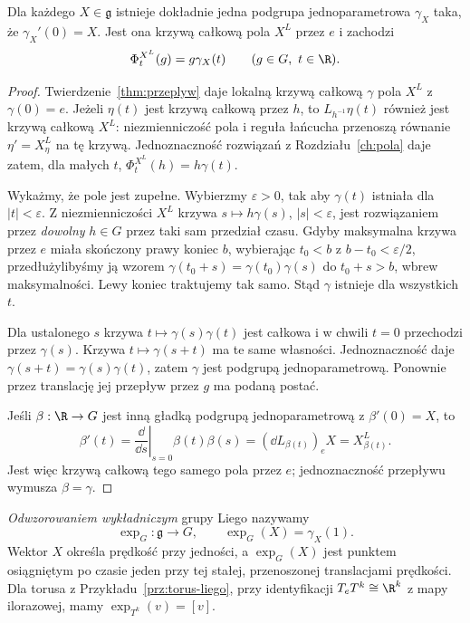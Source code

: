 \begin{twierdzenie}
\label{thm:one-param-lie}
Dla każdego $X\in\mathfrak g$ istnieje dokładnie jedna
podgrupa jednoparametrowa $\gamma_X$ taka, że
$\gamma_X'(0)=X$. Jest ona krzywą całkową pola $X^L$
przez $e$ i zachodzi
\[
 \Phi_t^{X^L}(g)=g\gamma_X(t)
 \qquad (g\in G,\ t\in\R).
\]
\end{twierdzenie}
\begin{proof}
Twierdzenie~\ref{thm:przeplyw} daje lokalną krzywą
całkową $\gamma$ pola $X^L$ z $\gamma(0)=e$.
Jeżeli $\eta(t)$ jest krzywą całkową przez $h$, to
$L_{h^{-1}}\eta(t)$ również jest krzywą całkową $X^L$:
niezmienniczość pola i reguła łańcucha przenoszą równanie
$\eta'=X^L_\eta$ na tę krzywą. Jednoznaczność rozwiązań
z Rozdziału~\ref{ch:pola} daje zatem, dla małych $t$,
$\Phi_t^{X^L}(h)=h\gamma(t)$.

Wykażmy, że pole jest zupełne. Wybierzmy $\varepsilon>0$,
tak aby $\gamma(t)$ istniała dla $|t|<\varepsilon$.
Z niezmienniczości $X^L$ krzywa
$s\mapsto h\gamma(s)$, $|s|<\varepsilon$, jest
rozwiązaniem przez \emph{dowolny} $h\in G$ przez taki sam
przedział czasu. Gdyby maksymalna krzywa przez $e$ miała
skończony prawy koniec $b$, wybierając $t_0<b$ z
$b-t_0<\varepsilon/2$, przedłużylibyśmy ją wzorem
$\gamma(t_0+s)=\gamma(t_0)\gamma(s)$ do
$t_0+s>b$, wbrew maksymalności. Lewy koniec traktujemy
tak samo. Stąd $\gamma$ istnieje dla wszystkich $t$.

Dla ustalonego $s$ krzywa $t\mapsto\gamma(s)\gamma(t)$
jest całkowa i w chwili $t=0$ przechodzi przez
$\gamma(s)$. Krzywa $t\mapsto\gamma(s+t)$ ma te same
własności. Jednoznaczność daje
$\gamma(s+t)=\gamma(s)\gamma(t)$, zatem $\gamma$ jest
podgrupą jednoparametrową. Ponownie przez translację
jej przepływ przez $g$ ma podaną postać.

Jeśli $\beta:\R\to G$ jest inną gładką podgrupą
jednoparametrową z $\beta'(0)=X$, to
\[
 \beta'(t)=\left.\frac{\dd}{\dd s}\right|_{s=0}
 \beta(t)\beta(s)=(\dd L_{\beta(t)})_eX=X^L_{\beta(t)}.
\]
Jest więc krzywą całkową tego samego pola przez $e$;
jednoznaczność przepływu wymusza $\beta=\gamma$.
\end{proof}

\begin{definicja}
\label{def:lie-exp}
\emph{Odwzorowaniem wykładniczym} grupy Liego nazywamy
\[
 \exp_G:\mathfrak g\longrightarrow G,\qquad
 \exp_G(X)=\gamma_X(1).
\]
Wektor $X$ określa prędkość przy jedności, a $\exp_G(X)$
jest punktem osiągniętym po czasie jeden przy tej stałej,
przenoszonej translacjami prędkości. Dla torusa z
Przykładu~\ref{prz:torus-liego}, przy identyfikacji
$T_eT^k\cong\R^k$ z mapy ilorazowej, mamy
$\exp_{T^k}(v)=[v]$.
\end{definicja}

